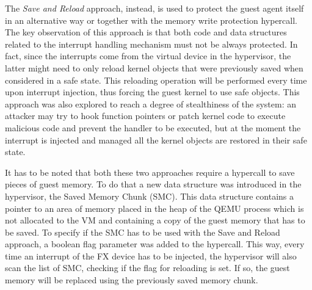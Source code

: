 \par %
The \emph{Save and Reload} approach, instead, is used to protect the guest agent itself in an alternative way or together with the memory write protection hypercall. The key observation of this approach is that both code and data structures related to the interrupt handling mechanism must not be always protected. In fact, since the interrupts come from the virtual device in the hypervisor, the latter might need to only reload kernel objects that were previously saved when considered in a safe state. This reloading operation will be performed every time upon interrupt injection, thus forcing the guest kernel to use safe objects. This approach was also explored to reach a degree of stealthiness of the system: an attacker may try to hook function pointers or patch kernel code to execute malicious code and prevent the handler to be executed, but at the moment the interrupt is injected and managed all the kernel objects are restored in their safe state.
\par %
It has to be noted that both these two approaches require a hypercall to save pieces of guest memory. To do that a new data structure was introduced in the hypervisor, the Saved Memory Chunk (SMC). This data structure contains a pointer to an area of memory placed in the heap of the QEMU process which is not allocated to the VM and containing a copy of the guest memory that has to be saved. To specify if the SMC has to be used with the Save and Reload approach, a boolean flag parameter was added to the hypercall. This way, every time an interrupt of the FX device has to be injected, the hypervisor will also scan the list of SMC, checking if the flag for reloading is set. If so, the guest memory will be replaced using the previously saved memory chunk.

